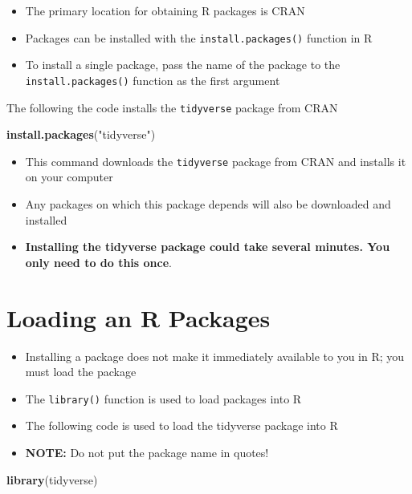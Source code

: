 \documentclass[
]{book}
\newenvironment{Shaded}{\begin{snugshade}}{\end{snugshade}}
\newcommand{\FunctionTok}[1]{\textcolor[rgb]{0.13,0.29,0.53}{\textbf{#1}}}
\newcommand{\NormalTok}[1]{#1}
\newcommand{\StringTok}[1]{\textcolor[rgb]{0.31,0.60,0.02}{#1}}
\begin{document}
\begin{itemize}
\item
  The primary location for obtaining R packages is CRAN
\item
  Packages can be installed with the \texttt{install.packages()} function in R
\item
  To install a single package, pass the name of the package to the \texttt{install.packages()} function as the first argument
\end{itemize}

The following the code installs the \texttt{tidyverse} package from CRAN

\begin{Shaded}
\begin{Highlighting}[]
\FunctionTok{install.packages}\NormalTok{(}\StringTok{"tidyverse"}\NormalTok{)}
\end{Highlighting}
\end{Shaded}

\begin{itemize}
\item
  This command downloads the \texttt{tidyverse} package from CRAN and installs it on your computer
\item
  Any packages on which this package depends will also be downloaded and installed
\item
  \textbf{Installing the tidyverse package could take several minutes. You only need to do this once}.
\end{itemize}

\hypertarget{loading-an-r-packages-1}{%
\section{Loading an R Packages}\label{loading-an-r-packages-1}}

\begin{itemize}
\item
  Installing a package does not make it immediately available to you in R; you must load the package
\item
  The \texttt{library()} function is used to load packages into R
\item
  The following code is used to load the tidyverse package into R
\item
  \textbf{NOTE:} Do not put the package name in quotes!
\end{itemize}

\begin{Shaded}
\begin{Highlighting}[]
\FunctionTok{library}\NormalTok{(tidyverse)}
\end{Highlighting}
\end{Shaded}
\end{document}
